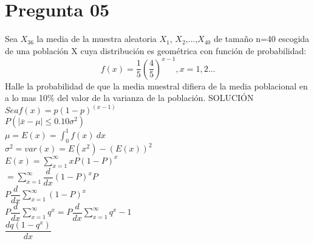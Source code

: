 \documentclass[10pt,a4paper]{article}
\begin{document}
\section{Pregunta 05}
Sea $X_{36}$ la media de la muestra aleatoria $X_{1}$, $X_{2}$,...,$X_{40}$ de tamaño n=40 escogida de una población X cuya distribución es geométrica con función de probabilidad:
$$f(x) = \dfrac{1}{5}(\dfrac{4}{5})^{x-1} , x=1,2...$$
Halle la probabilidad de que la media muestral difiera de la media poblacional en a lo mas 10\% del valor de la varianza de la población. 
SOLUCIÓN\\
$Sea f(x) = p(1-p)^(x-1)$\\
\newline
$P(|\overline{x}-\mu| \leq 0.10 \sigma^2)$\\
\newline
$\mu = E(x) = \int_{0}^{1} f(x) \ dx $\\
\newline
$\sigma^2 = var(x) = E(x^2) - (E(x))^2$\\
\newline
$E(x) = \sum_{x=1}^{\infty} x P(1-P)^x$\\
\newline
$ =\sum_{x=1}^{\infty} \dfrac{d}{dx}(1-P)^xP$\\
\newline
$P\dfrac{d}{dx} \sum_{x=1}^{\infty} (1-P)^x$\\
\newline
$P\dfrac{d}{dx} \sum_{x=1}^{\infty} q^x = P\dfrac{d}{dx} \sum_{x=1}^{\infty} q^x-1$\\
\newline
$\dfrac{d q(1-q^x)}{dx}$
\end{document}
